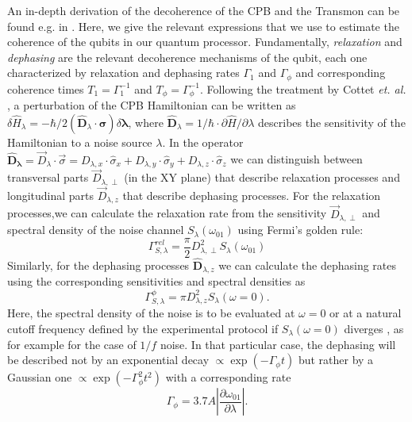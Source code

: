 An in-depth derivation of the decoherence of the CPB and the Transmon can be found e.g. in \citep{cottet_implementation_2002,koch_charge-insensitive_2007}. Here, we give the relevant expressions that we use to estimate the coherence of the qubits in our quantum processor. Fundamentally, {\it relaxation} and {\it dephasing} are the relevant decoherence mechanisms of the qubit, each one characterized by relaxation and dephasing rates $\Gamma_1$ and $\Gamma_\phi$ and corresponding coherence times $T_1=\Gamma_1^{-1}$ and $T_\phi=\Gamma_\phi^{-1}$. Following the treatment by Cottet {\it et. al.} \citep{cottet_implementation_2002}, a perturbation of the CPB Hamiltonian can be written as $\delta \hat{H}_{\lambda}=-\hbar/2(\mathbf{\hat{D}}_\lambda\cdot\mathbf{\sigma})\delta \mathbf{\lambda}$, where $\mathbf{\hat{D}}_\lambda=1/\hbar\cdot \partial \hat{H}/\partial \lambda$ describes the sensitivity of the Hamiltonian to a noise source $\lambda$. In the operator $\mathbf{\hat{D}_\lambda}=\vec{D}_\lambda\cdot \vec{\sigma}=D_{\lambda,x}\cdot\hat{\sigma}_x+D_{\lambda,y}\cdot\hat{\sigma}_y+D_{\lambda,z}\cdot\hat{\sigma}_z$ we can distinguish between transversal parts $\vec{D}_{\lambda,\perp}$ (in the XY plane) that describe relaxation processes and longitudinal parts $\vec{D}_{\lambda,z}$ that describe dephasing processes. For the relaxation processes,we can calculate the relaxation rate from the sensitivity $\vec{D}_{\lambda,\perp}$ and spectral density of the noise channel $S_{\lambda}(\omega_{01})$ using Fermi's golden rule:
%
\begin{equation}
\Gamma^{rel}_{S,\lambda} = \frac{\pi}{2}D_{\lambda,\perp}^2 S_{\lambda}(\omega_{01}) \label{eq:relaxation_rate}
\end{equation}
%
Similarly, for the dephasing processes $\hat{\mathbf{D}}_{\lambda,z}$ we can calculate the dephasing rates using the corresponding sensitivities and spectral densities as
%
\begin{equation}
\Gamma_{S,\lambda}^\phi = \pi D_{\lambda,z}^2 S_{\lambda}(\omega = 0).
\end{equation}
% 
Here, the spectral density of the noise is to be evaluated at $\omega=0$ or at a natural cutoff frequency defined by the experimental protocol if $S_{\lambda}(\omega=0)$ diverges \citep{cottet_implementation_2002}, as for example for the case of $1/f$ noise. In that particular case, the dephasing will be described not by an exponential decay $\propto\exp{(-\Gamma_\phi t)}$ but rather by a Gaussian one $\propto\exp{(-\Gamma_\phi^2 t^2)}$ with a corresponding rate
%
\begin{equation}
\Gamma_\phi =3.7A \left|\frac{\partial \omega_{01}}{\partial \lambda}\right|.
\end{equation}

